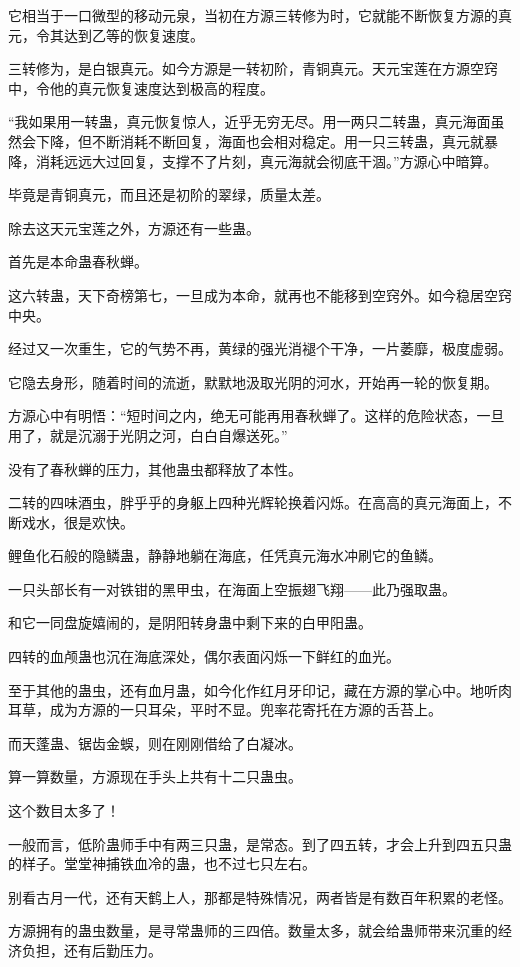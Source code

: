 \begin{this_body}
它相当于一口微型的移动元泉，当初在方源三转修为时，它就能不断恢复方源的真元，令其达到乙等的恢复速度。

三转修为，是白银真元。如今方源是一转初阶，青铜真元。天元宝莲在方源空窍中，令他的真元恢复速度达到极高的程度。

“我如果用一转蛊，真元恢复惊人，近乎无穷无尽。用一两只二转蛊，真元海面虽然会下降，但不断消耗不断回复，海面也会相对稳定。用一只三转蛊，真元就暴降，消耗远远大过回复，支撑不了片刻，真元海就会彻底干涸。”方源心中暗算。

毕竟是青铜真元，而且还是初阶的翠绿，质量太差。

除去这天元宝莲之外，方源还有一些蛊。

首先是本命蛊春秋蝉。

这六转蛊，天下奇榜第七，一旦成为本命，就再也不能移到空窍外。如今稳居空窍中央。

经过又一次重生，它的气势不再，黄绿的强光消褪个干净，一片萎靡，极度虚弱。

它隐去身形，随着时间的流逝，默默地汲取光阴的河水，开始再一轮的恢复期。

方源心中有明悟：“短时间之内，绝无可能再用春秋蝉了。这样的危险状态，一旦用了，就是沉溺于光阴之河，白白自爆送死。”

没有了春秋蝉的压力，其他蛊虫都释放了本性。

二转的四味酒虫，胖乎乎的身躯上四种光辉轮换着闪烁。在高高的真元海面上，不断戏水，很是欢快。

鲤鱼化石般的隐鳞蛊，静静地躺在海底，任凭真元海水冲刷它的鱼鳞。

一只头部长有一对铁钳的黑甲虫，在海面上空振翅飞翔——此乃强取蛊。

和它一同盘旋嬉闹的，是阴阳转身蛊中剩下来的白甲阳蛊。

四转的血颅蛊也沉在海底深处，偶尔表面闪烁一下鲜红的血光。

至于其他的蛊虫，还有血月蛊，如今化作红月牙印记，藏在方源的掌心中。地听肉耳草，成为方源的一只耳朵，平时不显。兜率花寄托在方源的舌苔上。

而天蓬蛊、锯齿金蜈，则在刚刚借给了白凝冰。

算一算数量，方源现在手头上共有十二只蛊虫。

这个数目太多了！

一般而言，低阶蛊师手中有两三只蛊，是常态。到了四五转，才会上升到四五只蛊的样子。堂堂神捕铁血冷的蛊，也不过七只左右。

别看古月一代，还有天鹤上人，那都是特殊情况，两者皆是有数百年积累的老怪。

方源拥有的蛊虫数量，是寻常蛊师的三四倍。数量太多，就会给蛊师带来沉重的经济负担，还有后勤压力。


\end{this_body}

